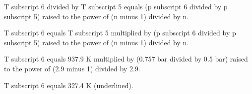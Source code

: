 T subscript 6 divided by T subscript 5 equals (p subscript 6 divided by p subscript 5) raised to the power of (n minus 1) divided by n.  

T subscript 6 equals T subscript 5 multiplied by (p subscript 6 divided by p subscript 5) raised to the power of (n minus 1) divided by n.  

T subscript 6 equals 937.9 K multiplied by (0.757 bar divided by 0.5 bar) raised to the power of (2.9 minus 1) divided by 2.9.  

T subscript 6 equals 327.4 K (underlined).